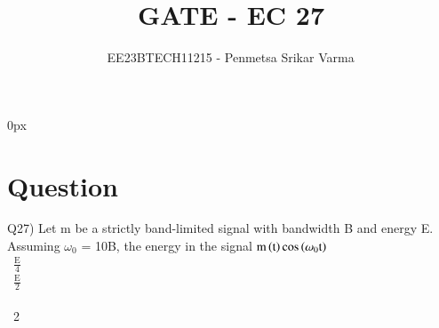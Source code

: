 \documentclass[journal,12pt,twocolumn]{IEEEtran}
\theoremstyle{remark}
\begin{document}

\parindent 0px


\title{GATE - EC 27}
\author{EE23BTECH11215 - Penmetsa Srikar Varma$^{}$%
}
\maketitle
\newpage
\bigskip

\renewcommand{\thefigure}{\theenumi}
\renewcommand{\thetable}{\theenumi}
\section*{Question}
Q27) Let m be a strictly band-limited signal with bandwidth B and energy E. Assuming $\omega_0$ = 10B, the energy in the signal $\text{m}\left(\text{t}\right)\text{cos}\left(\omega_0\text{t}\right)$\\[1ex]
\ $\frac{\text{E}}{4}$\\[1ex]
\ $\frac{\text{E}}{2}$\\[1ex]
\ \\[1ex]
\ 2 \qquad\qquad\qquad\quad\qquad\qquad\qquad\qquad{}
\end{document}
